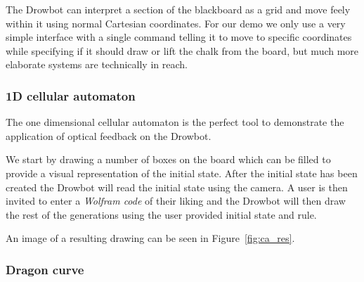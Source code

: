 \documentclass[a4paper,10pt]{article}
\begin{document}
The Drowbot can interpret a section of the blackboard as a grid
and move feely within it using normal Cartesian coordinates.
For our demo we only use a very simple interface with a single
command telling it to move to specific coordinates while specifying
if it should draw or lift the chalk from the board, but much more
elaborate systems are technically in reach.


\subsubsection*{1D cellular automaton}


The one dimensional cellular automaton\cite{elemca} is the perfect 
tool to demonstrate the application of optical feedback on the Drowbot.

We start by drawing a number of boxes on the board which can be
filled to provide a visual representation of the initial state.
After the initial state has been created the
Drowbot will read the initial state using the camera.
A user is then invited to enter a \emph{Wolfram code}\cite{elemca} of their liking
and the Drowbot will then draw the rest of the generations
using the user provided initial state and rule.

An image of a resulting drawing can be seen in Figure~\ref{fig:ca_res}.



\subsubsection*{Dragon curve}
\end{document}
